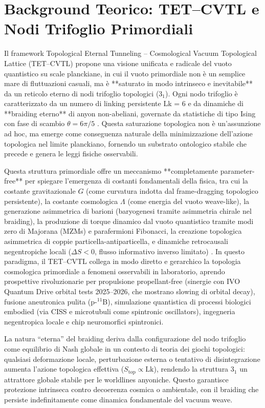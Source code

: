 \documentclass[11pt,a4paper]{article}
\let\oldcite\cite
\renewcommand{\cite}{\protect\oldcite}
\theoremstyle{plain}
\theoremstyle{definition}
\begin{document}
\section{Background Teorico: TET--CVTL e Nodi Trifoglio Primordiali}

Il framework Topological Eternal Tunneling -- Cosmological Vacuum Topological Lattice (TET--CVTL) propone una visione unificata e radicale del vuoto quantistico su scale planckiane, in cui il vuoto primordiale non è un semplice mare di fluttuazioni casuali, ma è **saturato in modo intrinseco e inevitabile** da un reticolo eterno di nodi trifoglio topologici (3$_1$). Ogni nodo trifoglio è caratterizzato da un numero di linking persistente Lk = 6 e da dinamiche di **braiding eterno** di anyon non-abeliani, governate da statistiche di tipo Ising con fase di scambio $\theta = 6\pi/5$ \cite{PhysSoliman2026Eternal, PhysSoliman2026CVTLCore, PhysSoliman2026PrimordialTrefoil}. Questa saturazione topologica non è un'assunzione ad hoc, ma emerge come conseguenza naturale della minimizzazione dell'azione topologica nel limite planckiano, fornendo un substrato ontologico stabile che precede e genera le leggi fisiche osservabili.

Questa struttura primordiale offre un meccanismo **completamente parameter-free** per spiegare l'emergenza di costanti fondamentali della fisica, tra cui la costante gravitazionale $G$ (come curvatura indotta dal frame-dragging topologico persistente), la costante cosmologica $\Lambda$ (come energia del vuoto weave-like), la generazione asimmetrica di barioni (baryogenesi tramite asimmetria chirale nel braiding), la produzione di torque dinamico dal vuoto quantistico tramite modi zero di Majorana (MZMs) e parafermioni Fibonacci, la creazione topologica asimmetrica di coppie particella-antiparticella, e dinamiche retrocausali negentropiche locali ($\Delta S < 0$, flusso informativo inverso limitato) \cite{PhysSoliman2026p11B, PhysSoliman2026Vacuum, PhysSoliman2026DeSitter}. In questo paradigma, il TET--CVTL collega in modo diretto e gerarchico la topologia cosmologica primordiale a fenomeni osservabili in laboratorio, aprendo prospettive rivoluzionarie per propulsione propellant-free (sinergie con IVO Quantum Drive orbital tests 2025–2026, che mostrano slowing di orbital decay), fusione aneutronica pulita (p-$^{11}$B), simulazione quantistica di processi biologici embodied (via CISS e microtubuli come spintronic oscillators), ingegneria negentropica locale e chip neuromorfici spintronici.

La natura ``eterna'' del braiding deriva dalla configurazione del nodo trifoglio come equilibrio di Nash globale in un contesto di teoria dei giochi topologici: qualsiasi deformazione locale, perturbazione esterna o tentativo di disintegrazione aumenta l'azione topologica effettiva ($S_{\text{top}} \propto \mathrm{Lk}$), rendendo la struttura $3_1$ un attrattore globale stabile per le worldlines anyoniche. Questo garantisce protezione intrinseca contro decoerenza cosmica o ambientale, con il braiding che persiste indefinitamente come dinamica fondamentale del vacuum weave.
\end{document}
